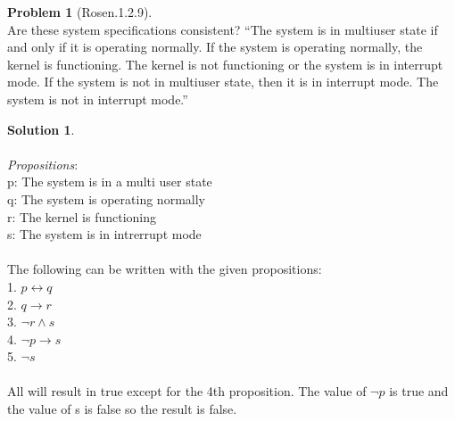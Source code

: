 \documentclass{article}
\theoremstyle{definition}
\newtheorem*{problem}{Problem}
\newtheorem*{solution}{Solution}
\begin{document}
\begin{problem}[Rosen.1.2.9]\ \\
Are these system specifications consistent? “The system
is in multiuser state if and only if it is operating normally.
If the system is operating normally, the kernel is functioning.
The kernel is not functioning or the system is
in interrupt mode. If the system is not in multiuser state,
then it is in interrupt mode. The system is not in interrupt
mode.”
\begin{compactenum}
\renewcommand{\theenumi}{\alph{enumi}}

\end{compactenum}
\end{problem}

\begin{solution}\ \\
\ \\
\textit{Propositions}:\ \\
p: The system is in a multi user state\ \\
q: The system is operating normally\ \\
r: The kernel is functioning\ \\
s: The system is in intrerrupt mode\ \\
\ \\
The following can be written with the given propositions:\ \\
1. $p \leftrightarrow q$\ \\
2. $q \rightarrow r $\ \\
3. $\neg r \wedge s$\ \\
4. $\neg p \rightarrow s$\ \\
5. $\neg s$ \ \\
\ \\
All will result in true except for the 4th proposition. The value of $\neg p$ is true and the value of s is false so the result is false.
\begin{compactenum}
\renewcommand{\theenumi}{\alph{enumi}}

\end{compactenum}
\end{solution}
\end{document}

